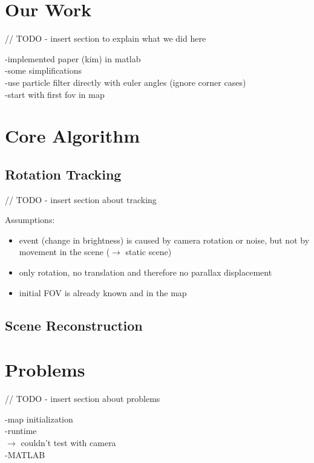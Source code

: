 \documentclass[10pt,twocolumn,letterpaper]{article}
\begin{document}


\section{Our Work}

// TODO - insert section to explain what we did here

-implemented paper (kim) in matlab\\
-some simplifications\\
	-use particle filter directly with euler angles (ignore corner cases)\\
	-start with first fov in map\\
	
\section{Core Algorithm}



\subsection{Rotation Tracking}

// TODO - insert section about tracking

Assumptions:
\begin{itemize}
\item event (change in brightness) is caused by camera rotation or noise, but not by movement in the scene ($\rightarrow$ static scene)
\item only rotation, no translation and therefore no parallax displacement
\item initial FOV is already known and in the map
\end{itemize}

\subsection{Scene Reconstruction}



\section{Problems}

// TODO - insert section about problems

-map initialization\\
-runtime\\
$\rightarrow$ couldn't test with camera\\
-MATLAB\\
\end{document}
